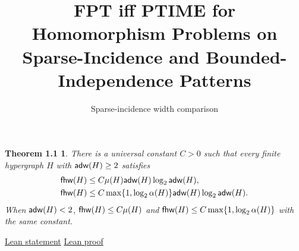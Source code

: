 \documentclass{article}
\title{FPT iff PTIME for Homomorphism Problems
on Sparse-Incidence and Bounded-Independence Patterns}
\author{Sparse-incidence width comparison}
\theoremstyle{plain}
\newtheorem*{homepagewidth}{Theorem 1.1}
\begin{document}
\begin{homepagewidth}
There is a universal constant $C>0$ such that every finite hypergraph $H$
with $\mathsf{adw}(H)\ge2$ satisfies
\[
 \begin{aligned}
  \mathsf{fhw}(H)&\le C\mu(H)\mathsf{adw}(H)\log_2\mathsf{adw}(H),\\
  \mathsf{fhw}(H)&\le C\max\{1,\log_2\alpha(H)\}\mathsf{adw}(H)\log_2\mathsf{adw}(H).
 \end{aligned}
\]
When $\mathsf{adw}(H)<2$, $\mathsf{fhw}(H)\le C\mu(H)$ and
$\mathsf{fhw}(H)\le C\max\{1,\log_2\alpha(H)\}$ with the same constant.
\end{homepagewidth}
\noindent\href{lean/Paper/TrustBoundary.html\#Paper.Hypergraph.MainWidthComparison}{Lean statement}
\quad\href{lean/Paper/RoundingComplete.html\#Paper.Hypergraph.main_width_comparison}{Lean proof}

\end{document}
